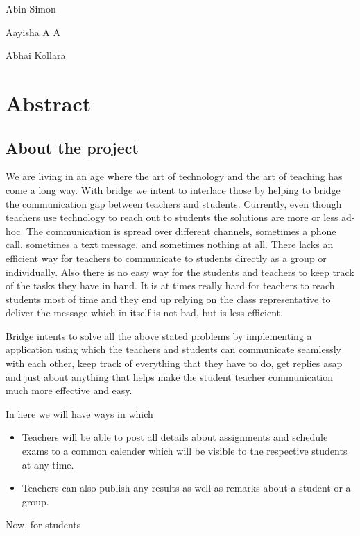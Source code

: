 \documentclass{article}
\begin{document}
\vspace{5em}

\begin{minipage}[b]{0.33333\textwidth}
\raggedright
Abin Simon
\end{minipage}%
\begin{minipage}[b]{0.33333\textwidth}
\centering
Aayisha A A
\end{minipage}%
\begin{minipage}[b]{0.33333\textwidth}
\raggedleft
Abhai Kollara
\end{minipage}

\newpage
\tableofcontents
\newpage

\section{Abstract}
\vspace{1em}
\subsection{About the project}

We are living in an age where the art of technology and the art of teaching has come a long way. With bridge we intent to interlace those by helping to bridge the communication gap between teachers and students. Currently, even though teachers use technology to reach out to students the solutions are more or less ad-hoc. The communication is spread over different channels, sometimes a phone call, sometimes a text message, and sometimes nothing at all. There lacks an efficient way for teachers to communicate to students directly as a group or individually. Also there is no easy way for the students and teachers to keep track of the tasks they have in hand. It is at times really hard for teachers to reach students most of time and they end up relying on the class representative to deliver the message which in itself is not bad, but is less efficient.

Bridge intents to solve all the above stated problems by implementing a application using which the teachers and students can communicate seamlessly with each other, keep track of everything that they have to do, get replies asap and just about anything that helps make the student teacher communication much more effective and easy.

In here we will have ways in which
\begin{itemize}
\item Teachers will be able to post all details about assignments and schedule exams to a common calender which will be visible to the respective students at any time.
\item Teachers can also publish any results as well as remarks about a student or a group.
\end{itemize}
Now, for students
\end{document}
